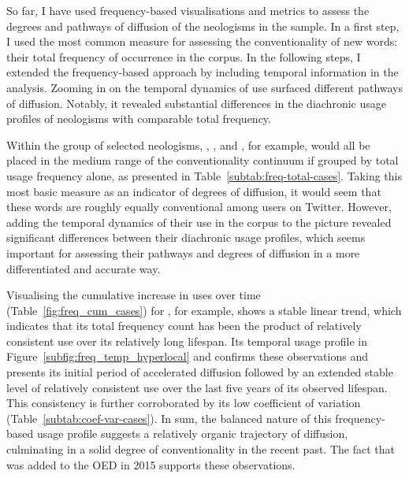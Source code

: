 \documentclass[
  a4paper,
  abstract=on,
  captions=tableabove
  ]{scrartcl}
\begin{document}
        So far, I have used frequency-based visualisations and metrics to assess the degrees and pathways of diffusion of the neologisms in the sample. In a first step, I used the most common measure for assessing the conventionality of new words: their total frequency of occurrence in the corpus. In the following steps, I extended the frequency-based approach by including temporal information in the analysis. Zooming in on the temporal dynamics of use surfaced different pathways of diffusion. Notably, it revealed substantial differences in the diachronic usage profiles of neologisms with comparable total frequency.

        Within the group of selected neologisms, , , and , for example, would all be placed in the medium range of the conventionality continuum if grouped by total usage frequency alone, as presented in Table~\ref{subtab:freq-total-cases}. Taking this most basic measure as an indicator of degrees of diffusion, it would seem that these words are roughly equally conventional among users on Twitter. However, adding the temporal dynamics of their use in the corpus to the picture revealed significant differences between their diachronic usage profiles, which seems important for assessing their pathways and degrees of diffusion in a more differentiated and accurate way.

        Visualising the cumulative increase in uses over time (Table~\ref{fig:freq_cum_cases}) for , for example, shows a stable linear trend, which indicates that its total frequency count has been the product of relatively consistent use over its relatively long lifespan. Its temporal usage profile in Figure~\ref{subfig:freq_temp_hyperlocal} and confirms these observations and presents its initial period of accelerated diffusion followed by an extended stable level of relatively consistent use over the last five years of its observed lifespan. This consistency is further corroborated by its low coefficient of variation (Table~\ref{subtab:coef-var-cases}). In sum, the balanced nature of this frequency-based usage profile suggests a relatively organic trajectory of diffusion, culminating in a solid degree of conventionality in the recent past. The fact that  was added to the OED in 2015 supports these observations.
\end{document}
